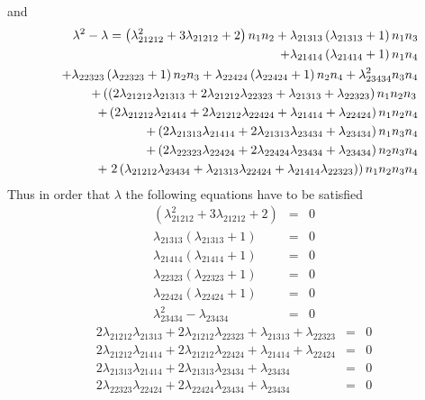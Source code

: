 \documentclass[12pt]{article}
\begin{document}
and 
\begin{eqnarray}
&&\lambda ^{2}-\lambda =\left( \lambda _{21212}^{2}+3\lambda
_{21212}+2\right) n_{1}n_{2}+\lambda _{21313}\left( \lambda
_{21313}+1\right) n_{1}n_{3}  \notag \\
&&+\lambda _{21414}\left( \lambda _{21414}+1\right) n_{1}n_{4}  \notag \\
&&+\lambda _{22323}\left( \lambda _{22323}+1\right) n_{2}n_{3}+\lambda
_{22424}\left( \lambda _{22424}+1\right) n_{2}n_{4}+\lambda
_{23434}^{2}n_{3}n_{4}  \notag \\
&&+\left( \left( 2\lambda _{21212}\lambda _{21313}+2\lambda _{21212}\lambda
_{22323}+\lambda _{21313}+\lambda _{22323}\right) n_{1}n_{2}n_{3}\right. 
\notag \\
&&+\left( 2\lambda _{21212}\lambda _{21414}+2\lambda _{21212}\lambda
_{22424}+\lambda _{21414}+\lambda _{22424}\right) n_{1}n_{2}n_{4}  \notag \\
&&+\left( 2\lambda _{21313}\lambda _{21414}+2\lambda _{21313}\lambda
_{23434}+\lambda _{23434}\right) n_{1}n_{3}n_{4}  \notag \\
&&+\left( 2\lambda _{22323}\lambda _{22424}+2\lambda _{22424}\lambda
_{23434}+\lambda _{23434}\right) n_{2}n_{3}n_{4}  \notag \\
&&+\left. 2\left( \lambda _{21212}\lambda _{23434}+\lambda _{21313}\lambda
_{22424}+\lambda _{21414}\lambda _{22323}\right) \right) n_{1}n_{2}n_{3}n_{4}
\end{eqnarray}%
Thus in order that $\lambda $ the following equations have to be satisfied%
\begin{eqnarray}
\left( \lambda _{21212}^{2}+3\lambda _{21212}+2\right) &=&0  \label{12} \\
\lambda _{21313}\left( \lambda _{21313}+1\right) &=&0  \label{13} \\
\lambda _{21414}\left( \lambda _{21414}+1\right) &=&0  \label{14} \\
\lambda _{22323}\left( \lambda _{22323}+1\right) &=&0  \label{23} \\
\lambda _{22424}\left( \lambda _{22424}+1\right) &=&0  \label{24} \\
\lambda _{23434}^{2}-\lambda _{23434} &=&0  \label{34}
\end{eqnarray}%
\begin{eqnarray}
2\lambda _{21212}\lambda _{21313}+2\lambda _{21212}\lambda _{22323}+\lambda
_{21313}+\lambda _{22323} &=&0 \\
2\lambda _{21212}\lambda _{21414}+2\lambda _{21212}\lambda _{22424}+\lambda
_{21414}+\lambda _{22424} &=&0 \\
2\lambda _{21313}\lambda _{21414}+2\lambda _{21313}\lambda _{23434}+\lambda
_{23434} &=&0 \\
2\lambda _{22323}\lambda _{22424}+2\lambda _{22424}\lambda _{23434}+\lambda
_{23434} &=&0
\end{eqnarray}%
\end{document}
